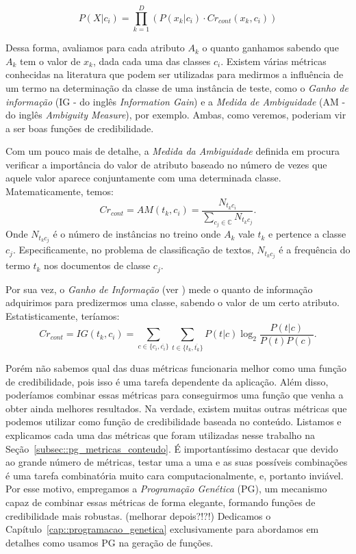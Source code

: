 \begin{equation}\label{eqn::classindependence_conteudo}
   P(X|c_{i}) = \prod^{D}_{k=1}{(P(x_k|c_i) \cdot Cr_{cont}(x_k,c_i))} 
\end{equation}

Dessa forma, avaliamos para cada atributo $A_k$ o quanto ganhamos sabendo que $A_k$ tem o valor de $x_k$, dada cada uma das classes $c_i$. Existem várias métricas conhecidas na literatura que podem ser utilizadas para medirmos a influência de um termo na determinação da classe de uma instância de teste, como o \textit{Ganho de informação} (IG - do inglês \textit{Information Gain}) e a \textit{Medida de Ambiguidade} (AM - do inglês \textit{Ambiguity Measure}), por exemplo. Ambas, como veremos, poderiam vir a ser boas funções de credibilidade. 


    Com um pouco mais de detalhe, a \textit{Medida da Ambiguidade} definida em \cite{Mengle08} procura verificar a importância do valor de atributo baseado no número de vezes que aquele valor aparece conjuntamente com uma determinada classe. Matematicamente, temos:
\begin{equation}\label{eqn::classindependence_conteudo_am}
   Cr_{cont} = AM(t_k, c_i) = \frac{ N_{t_{k}c_{i}}}{\sum_{c_j \in \mathbb{C}} N_{t_{k}c_{j}}}.
\end{equation}
   Onde $N_{t_{k}c_{j}}$ é o número de instâncias no treino onde $A_k$ vale $t_k$ e pertence a classe $c_j$. Especificamente, no problema de classificação de textos, $N_{t_{k}c_{j}}$ é a frequência do termo $t_k$ nos documentos de classe $c_j$.

    Por sua vez, o \textit{Ganho de Informação} (ver \cite{forman03}) mede o quanto de informação adquirimos para predizermos uma classe, sabendo o valor de um certo atributo. Estatisticamente, teríamos:
\begin{equation}\label{eqn::classindependence_conteudo_ig}
   Cr_{cont} = IG(t_k, c_i) = \sum_{c \in \{c_i, \overline{c_i}\}}\sum_{t \in \{t_k, \overline{t_k}\}}P(t|c)\log_2\frac{P(t|c)}{P(t)P(c)}.
\end{equation}

    Porém não sabemos qual das duas métricas funcionaria melhor como uma função de credibilidade, pois isso é uma tarefa dependente da aplicação. Além disso, poderíamos combinar essas métricas para conseguirmos uma função que venha a obter ainda melhores resultados. Na verdade, existem muitas outras métricas que podemos utilizar como função de credibilidade baseada no conteúdo. Listamos e explicamos cada uma das métricas que foram utilizadas nesse trabalho na Seção~\ref{subsec::pg_metricas_conteudo}. É importantíssimo destacar que devido ao grande número de métricas, testar uma a uma e as suas possíveis combinações é uma tarefa combinatória muito cara computacionalmente, e, portanto inviável. Por esse motivo, empregamos a \textit{Programação Genética} (PG), um mecanismo capaz de combinar essas métricas de forma elegante, formando funções de credibilidade mais robustas. (melhorar depois?!?!) Dedicamos o Capítulo~\ref{cap::programacao_genetica} exclusivamente para abordamos em detalhes como usamos PG na geração de funções.

